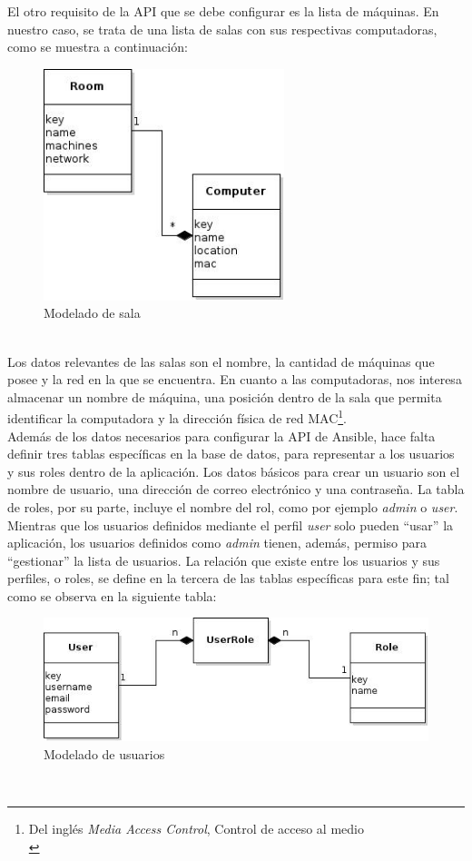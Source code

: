 \documentclass[a4paper,12pt]{article}
\begin{document}
El otro requisito de la API que se debe configurar es la lista de máquinas. En nuestro caso, se trata de una lista de salas con sus respectivas computadoras, como se muestra a continuación:\\

\begin{figure}[htb]
\centering
\includegraphics[width=7cm]{./img/Room.jpg}
\caption{Modelado de sala}
\end{figure}\\

Los datos relevantes de las salas son el nombre, la cantidad de máquinas que posee y la red en la que se encuentra. En cuanto a las computadoras, nos interesa almacenar un nombre de máquina, una posición dentro de la sala que permita identificar la computadora y la dirección física de red MAC\footnote{Del inglés \emph{Media Access Control}, Control de acceso al medio\\}.\\

Además de los datos necesarios para configurar la API de Ansible, hace falta definir tres tablas específicas en la base de datos, para representar a los usuarios y sus roles dentro de la aplicación. Los datos básicos para crear un usuario son el nombre de usuario, una dirección de correo electrónico y una contraseña. La tabla de roles, por su parte, incluye el nombre del rol, como por ejemplo \emph{admin} o \emph{user}. Mientras que los usuarios definidos mediante el perfil \emph{user} solo pueden “usar” la aplicación, los usuarios definidos como \emph{admin} tienen, además, permiso para “gestionar” la lista de usuarios. La relación que existe entre los usuarios y sus perfiles, o roles, se define en la tercera de las tablas específicas para este fin; tal como se observa en la siguiente tabla:\\

\begin{figure}[htb]
\centering
\includegraphics[width=.9\linewidth]{./img/user.jpg}
\caption{Modelado de usuarios}
\end{figure}\\
\end{document}
